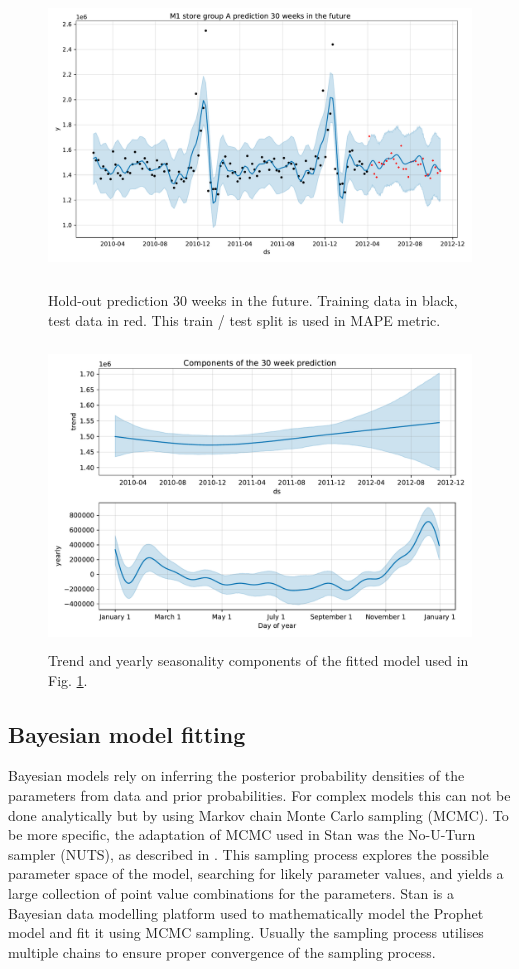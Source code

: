 \documentclass[english, 12pt, a4paper, sci, utf8, a-1b, online]{aaltothesis}
\begin{document}
\begin{figure}[htb]
	\centering
	\includegraphics[height=8cm]{../plots/forecasts/30_weeks_prediction_demo.pdf}
	\caption{Hold-out prediction 30 weeks in the future. Training data in black, test data in red. This train / test split is used in MAPE metric.}
	\label{fig:hold_out_data}
\end{figure}

\begin{figure}[htb]
	\centering
	\includegraphics[height=8cm]{../plots/forecasts/30_weeks_prediction_components_demo.pdf}
	\caption{Trend and yearly seasonality components of the fitted model used in Fig. \ref{fig:hold_out_data}.}
	\label{fig:prediction_components_demo}
\end{figure}

\subsection{Bayesian model fitting}

Bayesian models rely on inferring the posterior probability densities of the parameters from data and prior probabilities. For complex models this can not be done analytically but by using Markov chain Monte Carlo sampling (MCMC). To be more specific, the adaptation of MCMC used in Stan was the No-U-Turn sampler (NUTS), as described in \cite{NUTS}. This sampling process explores the possible parameter space of the model, searching for likely parameter values, and yields a large collection of point value combinations for the parameters. Stan is a Bayesian data modelling platform used to mathematically model the Prophet model and fit it using MCMC sampling. Usually the sampling process utilises multiple chains to ensure proper convergence of the sampling process.
\end{document}
